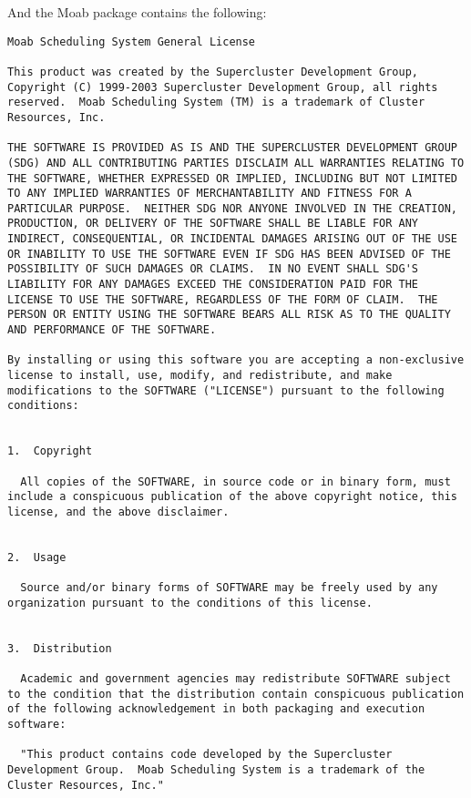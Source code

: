 And the Moab package contains the following:

\begin{verbatim}
Moab Scheduling System General License

This product was created by the Supercluster Development Group,
Copyright (C) 1999-2003 Supercluster Development Group, all rights
reserved.  Moab Scheduling System (TM) is a trademark of Cluster
Resources, Inc.

THE SOFTWARE IS PROVIDED AS IS AND THE SUPERCLUSTER DEVELOPMENT GROUP
(SDG) AND ALL CONTRIBUTING PARTIES DISCLAIM ALL WARRANTIES RELATING TO
THE SOFTWARE, WHETHER EXPRESSED OR IMPLIED, INCLUDING BUT NOT LIMITED
TO ANY IMPLIED WARRANTIES OF MERCHANTABILITY AND FITNESS FOR A
PARTICULAR PURPOSE.  NEITHER SDG NOR ANYONE INVOLVED IN THE CREATION,
PRODUCTION, OR DELIVERY OF THE SOFTWARE SHALL BE LIABLE FOR ANY
INDIRECT, CONSEQUENTIAL, OR INCIDENTAL DAMAGES ARISING OUT OF THE USE
OR INABILITY TO USE THE SOFTWARE EVEN IF SDG HAS BEEN ADVISED OF THE
POSSIBILITY OF SUCH DAMAGES OR CLAIMS.  IN NO EVENT SHALL SDG'S
LIABILITY FOR ANY DAMAGES EXCEED THE CONSIDERATION PAID FOR THE
LICENSE TO USE THE SOFTWARE, REGARDLESS OF THE FORM OF CLAIM.  THE
PERSON OR ENTITY USING THE SOFTWARE BEARS ALL RISK AS TO THE QUALITY
AND PERFORMANCE OF THE SOFTWARE.

By installing or using this software you are accepting a non-exclusive
license to install, use, modify, and redistribute, and make
modifications to the SOFTWARE ("LICENSE") pursuant to the following
conditions:


1.  Copyright

  All copies of the SOFTWARE, in source code or in binary form, must
include a conspicuous publication of the above copyright notice, this
license, and the above disclaimer.


2.  Usage

  Source and/or binary forms of SOFTWARE may be freely used by any
organization pursuant to the conditions of this license.


3.  Distribution

  Academic and government agencies may redistribute SOFTWARE subject
to the condition that the distribution contain conspicuous publication
of the following acknowledgement in both packaging and execution
software:

  "This product contains code developed by the Supercluster
Development Group.  Moab Scheduling System is a trademark of the
Cluster Resources, Inc."


\end{verbatim}
